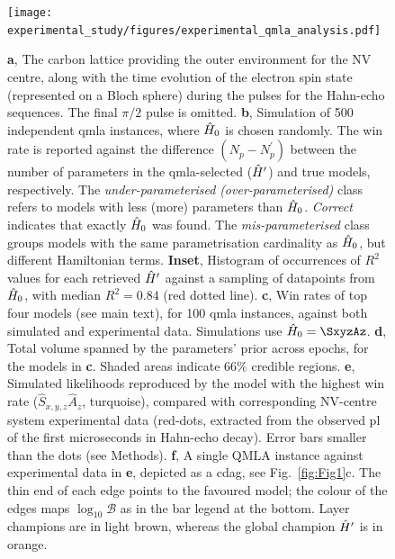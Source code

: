 \begin{figure}
    \label{fig:exp_qmla_analysis}
    \texttt{[image: experimental\_study/figures/experimental\_qmla\_analysis.pdf]}
    \caption[\gls{qmla} applied to experimental system.]{
        \textbf{a}, 
        The carbon lattice providing the outer environment for the NV centre, along with the
        time evolution of the electron spin state (represented on a Bloch sphere) during the pulses for the Hahn-echo sequences. The final $\pi/2$ pulse is omitted.  
        \textbf{b}, 
        Simulation of 500 independent \gls{qmla} instances, where $\hat{H}_0$ is chosen randomly. 
        The win rate is reported against the difference $(N_{p}-N^{\prime}_p)$ between the 
        number of parameters in the \gls{qmla}-selected ($\hat{H}^{\prime}$) and true models, respectively. 
        The \emph{under-parameterised} \emph{ (over-parameterised)} class refers to models with less (more) 
        parameters than $\hat{H}_0$. 
        \emph{Correct} indicates that exactly $\hat{H}_0$ was found. 
        The \emph{mis-parameterised} class groups models with the same parametrisation cardinality as $\hat{H}_0$, but different Hamiltonian terms. 
        \textbf{Inset}, Histogram of occurrences of $R^2$ values for each retrieved $\hat{H}^{\prime}$ 
        against a sampling of datapoints from $\hat{H}_0$, with median $R^2=0.84$ (red dotted line). 
        \textbf{c}, 
        Win rates of top four models (see main text), for 100 \gls{qmla} instances, 
        against both simulated and experimental data. 
        Simulations use $\ho = \SxyzAz$.
        \textbf{d}, 
        Total volume spanned by the parameters' prior across epochs, for the models in \textbf{c}. 
        Shaded areas indicate $66\%$ credible regions. 
        \textbf{e}, 
        Simulated likelihoods reproduced by the model with the highest win rate ($\hat{S}_{x,y,z}\hat{A}_{z}$, turquoise), compared with corresponding NV-centre system experimental data (red-dots, extracted from the observed \gls{pl} {of the first microseconds in Hahn-echo decay}). 
        Error bars smaller than the dots (see Methods).
        \textbf{f}, 
        A single QMLA instance against experimental data in \textbf{e}, depicted as a \gls{cdag}, see Fig.~\ref{fig:Fig1}c.
        The thin end of each edge points to the favoured model; 
        the colour of the edges maps $\log_{10}\mathcal{B}$ as in the bar legend at the bottom. 
        Layer champions \huc are in light brown, whereas the global champion $\hat{H}^{\prime}$  is in orange.    
    }
\end{figure}